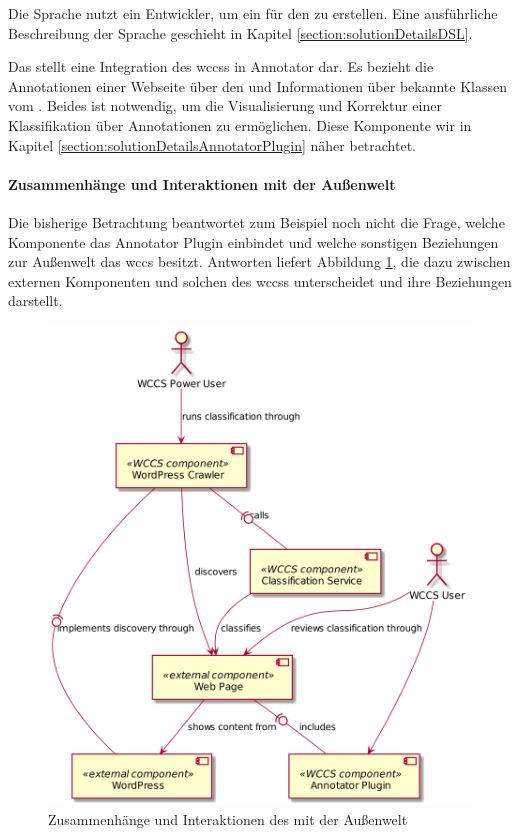         Die Sprache nutzt ein Entwickler, um ein {\classificationModel} für den
        {\classificationService} zu erstellen.
        Eine ausführliche Beschreibung der Sprache geschieht in Kapitel \ref{section:solutionDetailsDSL}.

        Das {\annotatorPlugin} stellt eine Integration des \glspl{wccs} in Annotator dar.
        Es bezieht die Annotationen einer Webseite über den {\annotationService}
        und Informationen über bekannte Klassen vom {\classificationService}.
        Beides ist notwendig, um die Visualisierung und Korrektur einer Klassifikation über Annotationen
        zu ermöglichen.
        Diese Komponente wir in Kapitel \ref{section:solutionDetailsAnnotatorPlugin} näher betrachtet.

        \paragraph{Zusammenhänge und Interaktionen mit der Außenwelt}
        Die bisherige Betrachtung beantwortet zum Beispiel noch nicht die Frage,
        welche Komponente das Annotator Plugin einbindet und welche sonstigen
        Beziehungen zur Außenwelt das \gls{wccs} besitzt.
        Antworten liefert Abbildung \ref{image:wccsExternalArchitecture},
        die dazu zwischen externen Komponenten und solchen des \glspl{wccs}
        unterscheidet und ihre Beziehungen darstellt.

        \begin{figure}
            \centering
            \includegraphics[scale=\imageScalingFactor]{../resources/architecture/external_architecture.png}
            \caption{Zusammenhänge und Interaktionen des  mit der Außenwelt}
            \label{image:wccsExternalArchitecture}
        \end{figure}

